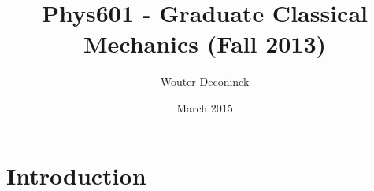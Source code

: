 \documentclass{article}
\title{Phys601 - Graduate Classical Mechanics (Fall 2013)}
\author{Wouter Deconinck}
\date{March 2015}
\begin{document}
\maketitle

\section{Introduction}
\end{document}
